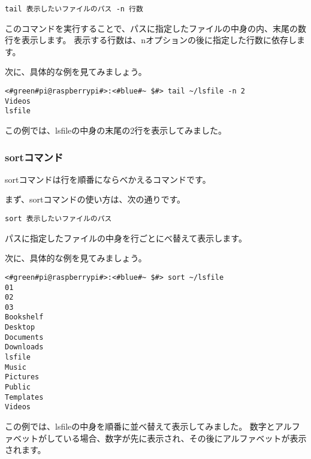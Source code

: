 \begin{lstlisting}[caption=tailコマンドの使い方, label=tail_usage]
tail 表示したいファイルのパス -n 行数
\end{lstlisting}

このコマンドを実行することで、パスに指定したファイルの中身の内、末尾の数行を表示します。
表示する行数は、nオプションの後に指定した行数に依存します。

次に、具体的な例を見てみましょう。

\begin{lstlisting}[caption=tailコマンドの実行例, label=shuf_example]
<#green#pi@raspberrypi#>:<#blue#~ $#> tail ~/lsfile -n 2
Videos
lsfile
\end{lstlisting}

この例では、lsfileの中身の末尾の2行を表示してみました。

\begin{tcolorbox}[title=\useOmetoi]
    \begin{enumerate}
    \end{enumerate}
\end{tcolorbox}

\subsubsection{sortコマンド}
sortコマンドは行を順番にならべかえるコマンドです。

まず、sortコマンドの使い方は、次の通りです。

\begin{lstlisting}[caption=sortコマンドの使い方, label=sort_usage]
sort 表示したいファイルのパス
\end{lstlisting}

パスに指定したファイルの中身を行ごとにべ替えて表示します。

次に、具体的な例を見てみましょう。

\begin{lstlisting}[caption=sortコマンドの実行例, label=sort_example]
<#green#pi@raspberrypi#>:<#blue#~ $#> sort ~/lsfile
01
02
03
Bookshelf
Desktop
Documents
Downloads
lsfile
Music
Pictures
Public
Templates
Videos
\end{lstlisting}

この例では、lsfileの中身を順番に並べ替えて表示してみました。
数字とアルファベットがしている場合、数字が先に表示され、その後にアルファベットが表示されます。

